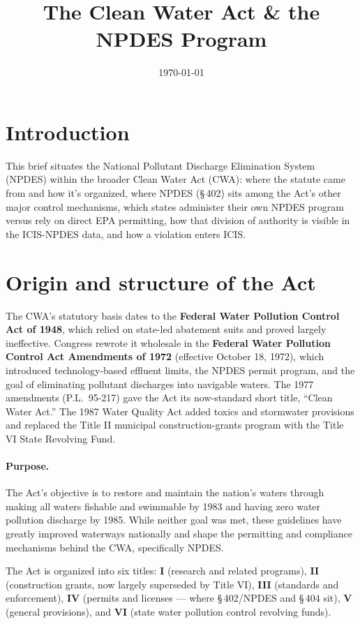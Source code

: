 \documentclass[11pt]{article}
\title{\vspace{-2.5em}The Clean Water Act \& the NPDES Program}
\author{}
\date{\today}
\begin{document}
\sloppy
\maketitle
\vspace{-2.5em}

\section*{Introduction}
This brief situates the National Pollutant Discharge Elimination System (NPDES) within
the broader Clean Water Act (CWA): where the statute came from and how it's organized,
where NPDES (\S\,402) sits among the Act's other major control mechanisms, which states
administer their own NPDES program versus rely on direct EPA permitting, how that
division of authority is visible in the ICIS-NPDES data, and how a violation enters
ICIS.

\section{Origin and structure of the Act}

The CWA's statutory basis dates to the \textbf{Federal Water Pollution Control Act of
1948}, which relied on state-led abatement suits and proved largely ineffective.
Congress rewrote it wholesale in the \textbf{Federal Water Pollution Control Act
Amendments of 1972} (effective October 18, 1972), which introduced technology-based
effluent limits, the NPDES permit program, and the goal of eliminating pollutant
discharges into navigable waters. The 1977 amendments (P.L.\ 95-217) gave the Act its
now-standard short title, ``Clean Water Act.'' The 1987 Water Quality Act added toxics
and stormwater provisions and replaced the Title II municipal construction-grants
program with the Title VI State Revolving Fund.

\paragraph{Purpose.} The Act's objective is to restore and maintain the nation's waters
through making all waters fishable and swimmable by 1983 and having zero water
pollution discharge by 1985. While neither goal was met, these guidelines have greatly
improved waterways nationally and shape the permitting and compliance mechanisms behind
the CWA, specifically NPDES.

The Act is organized into six titles: \textbf{I} (research and related programs),
\textbf{II} (construction grants, now largely superseded by Title VI), \textbf{III}
(standards and enforcement), \textbf{IV} (permits and licenses --- where \S\,402/NPDES
and \S\,404 sit), \textbf{V} (general provisions), and \textbf{VI} (state water
pollution control revolving funds).
\end{document}
